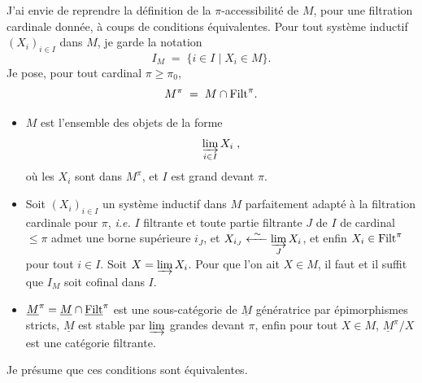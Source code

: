 J'ai envie de reprendre la définition de la $\pi$-accessibilité de $M$, pour une filtration cardinale donnée, à coups de conditions équivalentes. Pour tout système inductif $(X_i)_{i\in I}$ dans $M$, je garde la notation
\[
I_M \;=\; \{i\in I \mid X_i\in M\}.
\]
Je pose, pour tout cardinal $\pi\ge\pi_0$,
\[
M^\pi \;=\; M\cap\mathrm{Filt}^\pi .
\]

\begin{itemize}
\item[\circled{a$_\pi$}] $M$ est l'ensemble des objets de la forme
\[
\varinjlim_{i\in I} X_i \;,
\]
où les $X_i$ sont dans $M^\pi$, et $I$ est grand devant $\pi$.
\end{itemize}


\begin{itemize}
\item[\circled{b$_\pi$}] Soit $(X_i)_{i\in I}$ un système inductif dans $M$ parfaitement adapté à la filtration cardinale pour $\pi$, \textit{i.e.} $I$ filtrante et toute partie filtrante $J$ de $I$ de cardinal $\le\pi$ admet une borne supérieure $i_J$, et $X_{i_J}\xleftarrow{\ \sim\ }\varinjlim\limits_{J} X_i$, et enfin $X_i\in\mathrm{Filt}^\pi$ pour tout $i\in I$. Soit $X=\varinjlim X_i$. Pour que l'on ait $X\in M$, il faut et il suffit que $I_M$ soit cofinal dans $I$.
\item[\circled{c$_\pi$}] $\underline{M}^\pi=\underline{M}\cap\underline{\mathrm{Filt}}^\pi$ est une sous-catégorie de $\underline{M}$ génératrice par épimorphismes stricts, $\underline{M}$ est stable par $\varinjlim$ grandes devant $\pi$, enfin pour tout $X\in M$, $\underline{M}^\pi/X$ est une catégorie filtrante.
\end{itemize}

Je présume que ces conditions sont équivalentes.

